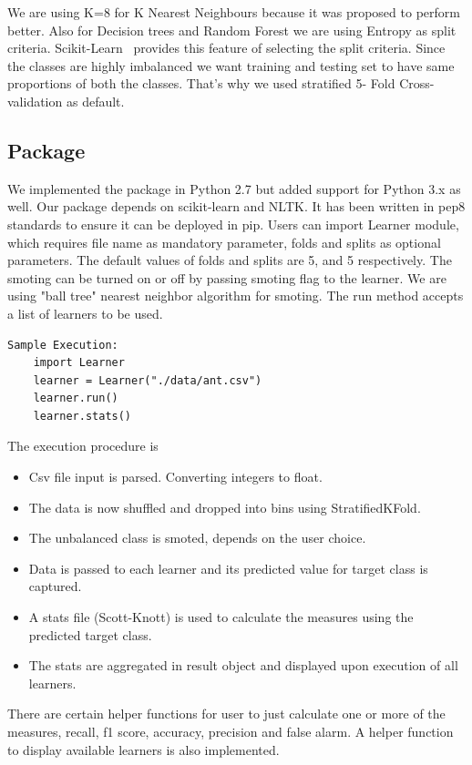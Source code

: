 \documentclass[conference]{IEEEtran}
\begin{document}
We are using K=8 for K Nearest Neighbours because it was proposed to perform better. Also for Decision trees and Random Forest we are using Entropy as split criteria. Scikit-Learn~\cite{pedregosa2011scikit} provides this feature of selecting the split criteria. Since the classes are highly imbalanced we want training and testing set to have same proportions of both the classes. That's why we used stratified 5- Fold Cross-validation as default.

\subsection{\textbf{Package}}

We implemented the package in Python 2.7 but added support for Python 3.x as well. Our package depends on scikit-learn and NLTK. It has been written in pep8 standards to ensure it can be deployed in pip. Users can import Learner module, which requires file name as mandatory parameter, folds and splits as optional parameters. The default values of folds and splits are 5, and 5 respectively. The smoting can be turned on or off by passing smoting flag to the learner. We are using "ball tree" nearest neighbor algorithm for smoting. The run method accepts a list of learners to be used. 

\begin{lstlisting}
Sample Execution:
    import Learner
    learner = Learner("./data/ant.csv")
    learner.run()
    learner.stats()
\end{lstlisting}

The execution procedure is 
\begin{itemize}
\item Csv file input is parsed. Converting integers to float.
\item The data is now shuffled and dropped into bins using StratifiedKFold.
\item The unbalanced class is smoted, depends on the user choice.
\item Data is passed to each learner and its predicted value for target class is captured.
\item A stats file (Scott-Knott) is used to calculate the measures using the predicted target class.
\item The stats are aggregated in result object and displayed upon execution of all learners.
\end{itemize}

There are certain helper functions for user to just calculate one or more of the measures, recall, f1 score, accuracy, precision and false alarm. A helper function to display available learners is also implemented.
\end{document}
